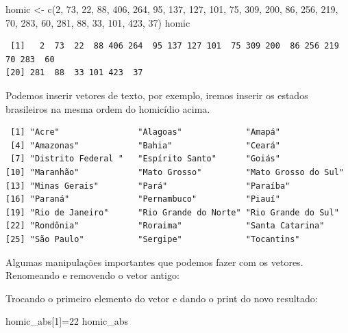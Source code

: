 \documentclass[
  letterpaper,
  DIV=11,
  numbers=noendperiod]{scrreprt}
\newenvironment{Shaded}{\begin{snugshade}}{\end{snugshade}}
\newcommand{\DecValTok}[1]{\textcolor[rgb]{0.68,0.00,0.00}{#1}}
\newcommand{\FunctionTok}[1]{\textcolor[rgb]{0.28,0.35,0.67}{#1}}
\newcommand{\NormalTok}[1]{\textcolor[rgb]{0.00,0.23,0.31}{#1}}
\newcommand{\OtherTok}[1]{\textcolor[rgb]{0.00,0.23,0.31}{#1}}
\begin{document}
\begin{Shaded}
\begin{Highlighting}[]
\NormalTok{homic }\OtherTok{\textless{}{-}} \FunctionTok{c}\NormalTok{(}\DecValTok{2}\NormalTok{,  }\DecValTok{73}\NormalTok{,  }\DecValTok{22}\NormalTok{,  }\DecValTok{88}\NormalTok{,  }\DecValTok{406}\NormalTok{,  }\DecValTok{264}\NormalTok{,    }\DecValTok{95}\NormalTok{,  }\DecValTok{137}\NormalTok{,  }\DecValTok{127}\NormalTok{,  }\DecValTok{101}\NormalTok{,  }\DecValTok{75}\NormalTok{,  }\DecValTok{309}\NormalTok{,  }\DecValTok{200}\NormalTok{,  }\DecValTok{86}\NormalTok{,  }\DecValTok{256}\NormalTok{,  }\DecValTok{219}\NormalTok{,  }\DecValTok{70}\NormalTok{,  }\DecValTok{283}\NormalTok{,  }\DecValTok{60}\NormalTok{,  }\DecValTok{281}\NormalTok{,  }\DecValTok{88}\NormalTok{,  }\DecValTok{33}\NormalTok{,  }\DecValTok{101}\NormalTok{,  }\DecValTok{423}\NormalTok{,  }\DecValTok{37}\NormalTok{)}
\NormalTok{homic}
\end{Highlighting}
\end{Shaded}

\begin{verbatim}
 [1]   2  73  22  88 406 264  95 137 127 101  75 309 200  86 256 219  70 283  60
[20] 281  88  33 101 423  37
\end{verbatim}

Podemos inserir vetores de texto, por exemplo, iremos inserir os estados
brasileiros na mesma ordem do homicídio acima.

\begin{verbatim}
 [1] "Acre"                "Alagoas"             "Amapá"              
 [4] "Amazonas"            "Bahia"               "Ceará"              
 [7] "Distrito Federal "   "Espírito Santo"      "Goiás"              
[10] "Maranhão"            "Mato Grosso"         "Mato Grosso do Sul" 
[13] "Minas Gerais"        "Pará"                "Paraíba"            
[16] "Paraná"              "Pernambuco"          "Piauí"              
[19] "Rio de Janeiro"      "Rio Grande do Norte" "Rio Grande do Sul"  
[22] "Rondônia"            "Roraima"             "Santa Catarina"     
[25] "São Paulo"           "Sergipe"             "Tocantins"          
\end{verbatim}

Algumas manipulações importantes que podemos fazer com os vetores.
Renomeando e removendo o vetor antigo:

Trocando o primeiro elemento do vetor e dando o print do novo resultado:

\begin{Shaded}
\begin{Highlighting}[]
\NormalTok{homic\_abs[}\DecValTok{1}\NormalTok{]}\OtherTok{=}\DecValTok{22}
\NormalTok{homic\_abs}
\end{Highlighting}
\end{Shaded}
\end{document}
